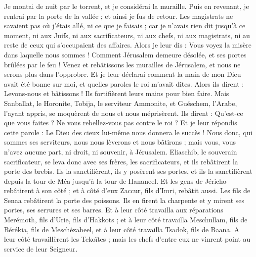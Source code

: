 \begin{multicols}{2}
Je montai de nuit par le torrent, et je considérai la muraille. Puis en revenant, je rentrai par la porte de la vallée ; et ainsi je fus de retour.
Les magistrats ne savaient pas où j'étais allé, ni ce que je faisais ; car je n'avais rien dit jusqu’à ce moment, ni aux Juifs, ni aux sacrificateurs, ni aux chefs, ni aux magistrats, ni au reste de ceux qui s'occupaient des affaires.
Alors je leur dis : Vous voyez la misère dans laquelle nous sommes ! Comment Jérusalem demeure désolée, et ses portes brûlées par le feu ! Venez et rebâtissons les murailles de Jérusalem, et nous ne serons plus dans l’opprobre.
Et je leur déclarai comment la main de mon Dieu avait été bonne sur moi, et quelles paroles le roi m'avait dites. Alors ils dirent : Levons-nous et bâtissons ! Ils fortifièrent leurs mains pour bien faire.
Mais Sanballat, le Horonite, Tobija, le serviteur Ammonite, et Guéschem, l’Arabe, l'ayant appris, se moquèrent de nous et nous méprisèrent. Ils dirent : Qu'est-ce que vous faites ? Ne vous rebellez-vous pas contre le roi ?
Et je leur répondis cette parole : Le Dieu des cieux lui-même nous donnera le succès ! Nous donc, qui sommes ses serviteurs, nous nous lèverons et nous bâtirons ; mais vous, vous n'avez aucune part, ni droit, ni souvenir, à Jérusalem.
\VerseOne{}Eliaschib, le souverain sacrificateur, se leva donc avec ses frères, les sacrificateurs, et ils rebâtirent la porte des brebis. Ils la sanctifièrent, ils y posèrent ses portes, et ils la sanctifièrent depuis la tour de Méa jusqu'à la tour de Hananeel.
Et les gens de Jéricho rebâtirent à son côté ; et à côté d'eux Zaccur, fils d'Imri, rebâtit aussi.
Les fils de Senaa rebâtirent la porte des poissons. Ils en firent la charpente et y mirent ses portes, ses serrures et ses barres.
Et à leur côté travailla aux réparations Merémoth, fils d'Urie, fils d'Hakkots ; et à leur côté travailla Meschullam, fils de Bérékia, fils de Meschézabeel, et à leur côté travailla Tsadok, fils de Baana.
A leur côté travaillèrent les Tekoïtes ; mais les chefs d'entre eux ne vinrent point au service de leur Seigneur.

\end{multicols}
